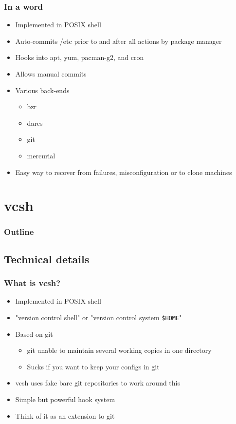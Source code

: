 \documentclass[t]{beamer}
\begin{document}
\begin{frame}
	\frametitle{In a word}
	\begin{itemize}
		\item Implemented in POSIX shell
		\item Auto-commits /etc prior to and after all actions by package manager
		\item Hooks into apt, yum, pacman-g2, and cron
		\item Allows manual commits
		\item Various back-ends
		\begin{itemize}
			\item bzr
			\item darcs
			\item git
			\item mercurial
		\end{itemize}
		\item Easy way to recover from failures, misconfiguration or to clone machines
	\end{itemize}
\end{frame}


\section{vcsh}
\begin{frame}
	\frametitle{Outline}
	\tableofcontents[currentsection]
\end{frame}

\subsection{Technical details}

\begin{frame}
	\frametitle{What is vcsh?}
	\begin{itemize}
		\item Implemented in POSIX shell
		\item "version control shell" or "version control system \texttt{\$HOME}"
		\item Based on git
		\begin{itemize}
			\item git unable to maintain several working copies in one directory
			\item Sucks if you want to keep your configs in git
		\end{itemize}
		\item vcsh uses fake bare git repositories to work around this
		\item Simple but powerful hook system
		\item Think of it as an extension to git
	\end{itemize}
\end{frame}
\end{document}
